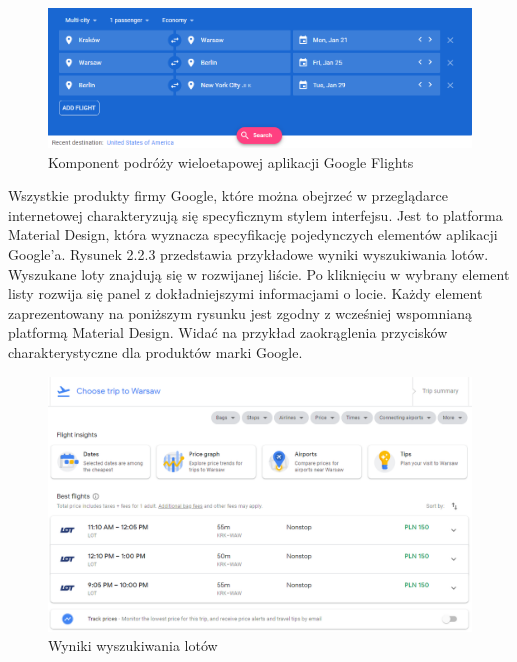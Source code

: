 \documentclass[12pt, twoside]{report}
\begin{document}
\begin{figure}[!ht]
\centering
\includegraphics[scale=0.60, keepaspectratio]{google_flights_multi.png}
\caption{Komponent podróży wieloetapowej aplikacji Google Flights}
\label{fig:google_flights_multi}
\end{figure}
Wszystkie produkty firmy Google, które można obejrzeć w przeglądarce internetowej charakteryzują się specyficznym stylem interfejsu. Jest to platforma Material Design, która wyznacza specyfikację pojedynczych elementów aplikacji Google'a. Rysunek 2.2.3 przedstawia przykładowe wyniki wyszukiwania lotów. Wyszukane loty znajdują się w rozwijanej liście. Po kliknięciu w wybrany element listy rozwija się panel z dokładniejszymi informacjami o locie. Każdy element zaprezentowany na poniższym rysunku jest zgodny z wcześniej wspomnianą platformą Material Design. Widać na przykład zaokrąglenia przycisków charakterystyczne dla produktów marki Google.
 
\begin{figure}[!ht]
\centering
\includegraphics[scale=0.50, keepaspectratio]{google_flights_result.png}
\caption{Wyniki wyszukiwania lotów}
\label{fig:google_flights_result}
\end{figure}

\newpage
\end{document}
